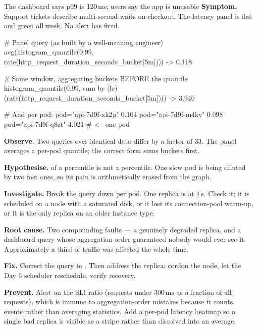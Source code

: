 \begin{debuglab}{The dashboard says p99 is 120\,ms; users say the app is unusable}
\textbf{Symptom.} Support tickets describe multi-second waits on checkout. The latency panel is flat and green all week. No alert has fired.

\begin{outbox}
# Panel query (as built by a well-meaning engineer)
avg(histogram_quantile(0.99, rate(http_request_duration_seconds_bucket[5m])))
  -> 0.118

# Same window, aggregating buckets BEFORE the quantile
histogram_quantile(0.99,
  sum by (le) (rate(http_request_duration_seconds_bucket[5m])))
  -> 3.940

# And per pod:
{pod="api-7d9f-xk2p"}  0.104
{pod="api-7d9f-m4kv"}  0.098
{pod="api-7d9f-q8zt"}  4.021   # <-- one pod
\end{outbox}

\begin{tickcheck}
  \item \textbf{Observe.} Two queries over identical data differ by a factor of 33. The panel averages a per-pod quantile; the correct form sums buckets first.
  \item \textbf{Hypothesise.}  of a percentile is not a percentile. One slow pod is being diluted by two fast ones, so its pain is arithmetically erased from the graph.
  \item \textbf{Investigate.} Break the query down per pod. One replica is at 4\,s. Check it: it is scheduled on a node with a saturated disk, or it lost its connection-pool warm-up, or it is the only replica on an older instance type.
  \item \textbf{Root cause.} Two compounding faults --- a genuinely degraded replica, and a dashboard query whose aggregation order guaranteed nobody would ever see it. Approximately a third of traffic was affected the whole time.
  \item \textbf{Fix.} Correct the query to . Then address the replica: cordon the node, let the Day 6 scheduler reschedule, verify recovery.
  \item \textbf{Prevent.} Alert on the SLI ratio (requests under 300\,ms as a fraction of all requests), which is immune to aggregation-order mistakes because it counts events rather than averaging statistics. Add a per-pod latency heatmap so a single bad replica is visible as a stripe rather than dissolved into an average.
\end{tickcheck}
\end{debuglab}


